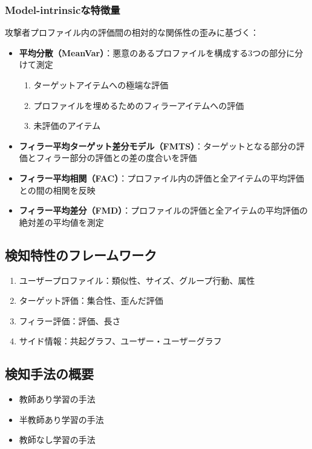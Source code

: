 \documentclass[11pt,a4paper]{article}
\begin{document}
\subsubsection{Model-intrinsicな特徴量}
攻撃者プロファイル内の評価間の相対的な関係性の歪みに基づく：
\begin{itemize}
    \item \textbf{平均分散（MeanVar）}：悪意のあるプロファイルを構成する3つの部分に分けて測定
    \begin{enumerate}
        \item ターゲットアイテムへの極端な評価
        \item プロファイルを埋めるためのフィラーアイテムへの評価
        \item 未評価のアイテム
    \end{enumerate}
    
    \item \textbf{フィラー平均ターゲット差分モデル（FMTS）}：ターゲットとなる部分の評価とフィラー部分の評価との差の度合いを評価
    \item \textbf{フィラー平均相関（FAC）}：プロファイル内の評価と全アイテムの平均評価との間の相関を反映
    \item \textbf{フィラー平均差分（FMD）}：プロファイルの評価と全アイテムの平均評価の絶対差の平均値を測定
\end{itemize}

\subsection{検知特性のフレームワーク}
\begin{enumerate}
    \item ユーザープロファイル：類似性、サイズ、グループ行動、属性
    \item ターゲット評価：集合性、歪んだ評価
    \item フィラー評価：評価、長さ
    \item サイド情報：共起グラフ、ユーザー・ユーザーグラフ
\end{enumerate}

\subsection{検知手法の概要}
\begin{itemize}
    \item 教師あり学習の手法
    \item 半教師あり学習の手法
    \item 教師なし学習の手法
\end{itemize}
\end{document}
